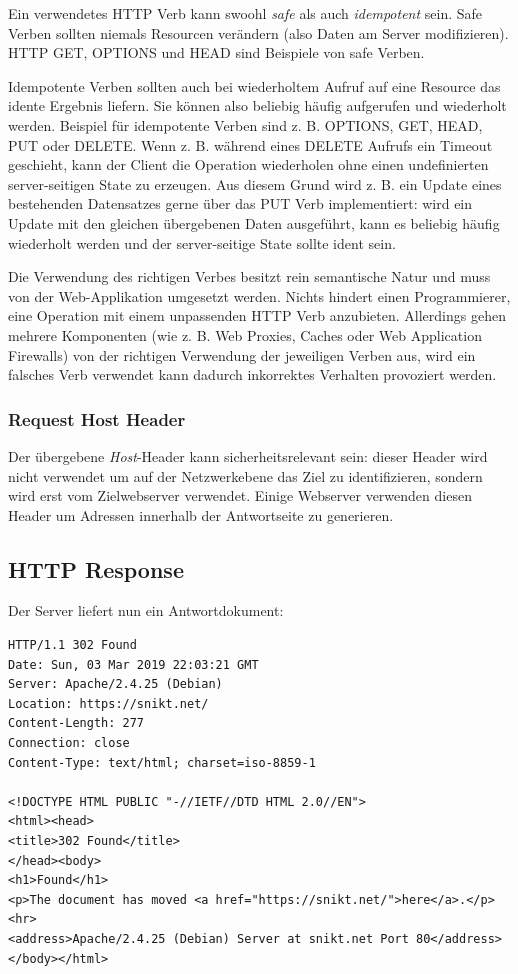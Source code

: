 Ein verwendetes HTTP Verb kann swoohl \textit{safe} als auch \textit{idempotent} sein. Safe Verben sollten niemals Resourcen verändern (also Daten am Server modifizieren). HTTP GET, OPTIONS und HEAD sind Beispiele von safe Verben.

Idempotente Verben sollten auch bei wiederholtem Aufruf auf eine Resource das idente Ergebnis liefern. Sie können also beliebig häufig aufgerufen und wiederholt werden. Beispiel für idempotente Verben sind z. B. OPTIONS, GET, HEAD, PUT oder DELETE. Wenn z. B. während eines DELETE Aufrufs ein Timeout geschieht, kann der Client die Operation wiederholen ohne einen undefinierten server-seitigen State zu erzeugen. Aus diesem Grund wird z. B. ein Update eines bestehenden Datensatzes gerne über das PUT Verb implementiert: wird ein Update mit den gleichen übergebenen Daten ausgeführt, kann es beliebig häufig wiederholt werden und der server-seitige State sollte ident sein.

Die Verwendung des richtigen Verbes besitzt rein semantische Natur und muss von der Web-Applikation umgesetzt werden. Nichts hindert einen Programmierer, eine Operation mit einem unpassenden HTTP Verb anzubieten. Allerdings gehen mehrere Komponenten (wie z. B. Web Proxies, Caches oder Web Application Firewalls) von der richtigen Verwendung der jeweiligen Verben aus, wird ein falsches Verb verwendet kann dadurch inkorrektes Verhalten provoziert werden.

\subsubsection{Request Host Header}

Der übergebene \textit{Host}-Header kann sicherheitsrelevant sein: dieser Header wird nicht verwendet um auf der Netzwerkebene das Ziel zu identifizieren, sondern wird erst vom Zielwebserver verwendet. Einige Webserver verwenden diesen Header um Adressen innerhalb der Antwortseite zu generieren.

\subsection{HTTP Response}

Der Server liefert nun ein Antwortdokument:

\begin{verbatim}
HTTP/1.1 302 Found
Date: Sun, 03 Mar 2019 22:03:21 GMT
Server: Apache/2.4.25 (Debian)
Location: https://snikt.net/
Content-Length: 277
Connection: close
Content-Type: text/html; charset=iso-8859-1

<!DOCTYPE HTML PUBLIC "-//IETF//DTD HTML 2.0//EN">
<html><head>
<title>302 Found</title>
</head><body>
<h1>Found</h1>
<p>The document has moved <a href="https://snikt.net/">here</a>.</p>
<hr>
<address>Apache/2.4.25 (Debian) Server at snikt.net Port 80</address>
</body></html>
\end{verbatim}


